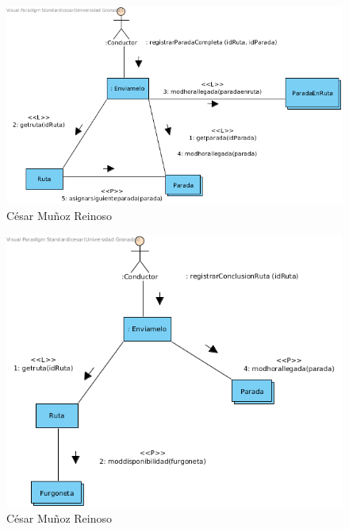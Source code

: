 \begin{figure}[H]
	\centering
	\includegraphics[width=16cm]{11}
	\caption{César Muñoz Reinoso}
\end{figure}
\begin{figure}[H]
	\centering
	\includegraphics[width=16cm]{12}
	\caption{César Muñoz Reinoso}
\end{figure}
\newpage
